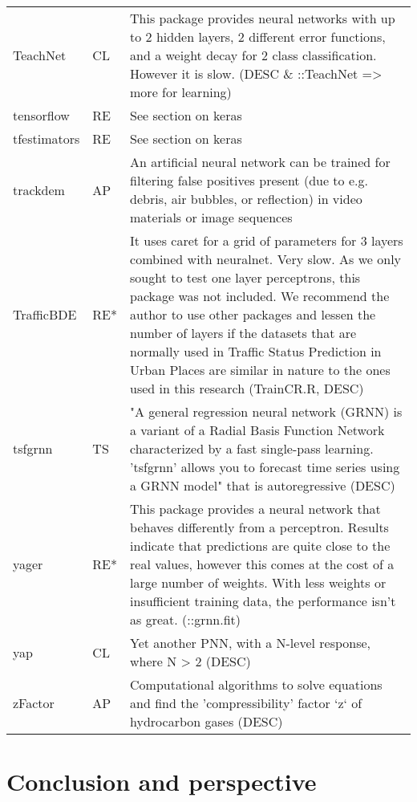 \begin{Schunk}
\begin{longtable}[t]{ll>{\raggedright\arraybackslash}p{10cm}}
TeachNet & CL & This package provides neural networks with up to 2 hidden layers, 2 different error functions, and a weight decay for 2 class classification. However it is slow. (DESC \& ::TeachNet => more for learning)\\
\addlinespace
tensorflow & RE & See section on keras\\
tfestimators & RE & See section on keras\\
trackdem & AP & An artificial neural network can be trained for filtering false positives present (due to e.g. debris, air bubbles, or reflection) in video materials or image sequences\\
TrafficBDE & RE* & It uses caret for a grid of parameters for 3 layers combined with neuralnet. Very slow. As we only sought to test one layer perceptrons, this package was not included. We recommend the author to use other packages and lessen the number of layers if the datasets that are normally used in Traffic Status Prediction in Urban Places are similar in nature to the ones used in this research (TrainCR.R, DESC)\\
tsfgrnn & TS & "A general regression neural network (GRNN) is a variant of a Radial Basis Function Network characterized by a fast single-pass learning. 'tsfgrnn' allows you to forecast time series using a GRNN model" that is autoregressive (DESC)\\
\addlinespace
yager & RE* & This package provides a neural network that behaves differently from a perceptron. Results indicate that predictions are quite close to the real values, however this comes at the cost of a large number of weights. With less weights or insufficient training data, the performance isn't as great. (::grnn.fit)\\
yap & CL & Yet another PNN, with a N-level response, where N > 2 (DESC)\\
zFactor & AP & Computational algorithms to solve equations and find the 'compressibility' factor `z` of hydrocarbon gases (DESC)\\
\bottomrule
\end{longtable}
\endgroup{}

\end{Schunk}

\hypertarget{conclusion-and-perspective}{%
\section{Conclusion and perspective}\label{conclusion-and-perspective}}

